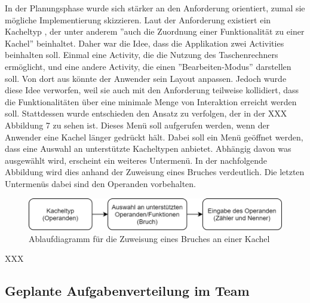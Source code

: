 In der Planungsphase wurde sich stärker an den Anforderung orientiert, zumal sie mögliche Implementierung skizzieren. Laut der Anforderung existiert ein Kacheltyp , der unter anderem ''auch die Zuordnung einer Funktionalität zu einer Kachel'' beinhaltet. Daher war die Idee, dass die Applikation zwei Activities beinhalten soll. Einmal eine Activity, die die Nutzung des Taschenrechners ermöglicht, und eine andere Activity, die einen ''Bearbeiten-Modus'' darstellen soll. Von dort aus könnte der Anwender sein Layout anpassen. Jedoch wurde diese Idee verworfen, weil sie auch mit den Anforderung teilweise kollidiert, dass die Funktionalitäten über eine minimale Menge von Interaktion erreicht werden soll. Stattdessen wurde entschieden den Ansatz zu verfolgen, der in der XXX Abbildung 7 zu sehen ist. Dieses Menü soll aufgerufen werden, wenn der Anwender eine Kachel länger gedrückt hält. 
Dabei soll ein Menü geöffnet werden, dass eine Auswahl an unterstützte Kacheltypen anbietet. Abhängig davon was ausgewählt wird, erscheint ein weiteres Untermenü. In der nachfolgende Abbildung wird dies anhand der Zuweisung eines Bruches verdeutlich. Die letzten Untermenüs dabei sind den Operanden vorbehalten.
 

\begin{figure}[!h]
	\includegraphics[width=1\columnwidth]{img/ablaufdiagramm-fuer-zuweisung}
	\caption[Ablaufdiagramm für die Zuweisung eines Bruches an einer Kachel]{Ablaufdiagramm für die Zuweisung eines Bruches an einer Kachel\footnotemark}
\end{figure}


XXX


\clearpage

\subsection{Geplante Aufgabenverteilung im Team }

